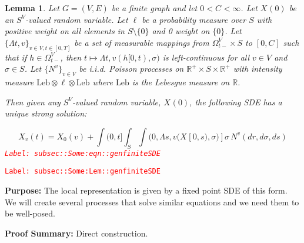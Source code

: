\documentclass[12pt]{article}
\newcommand{\mb}{\mathbb}
\newcommand{\te}{\text}
\newcommand{\tr}{\textcolor{red}}
\newcommand{\labe}[1]{\tr{\texttt{Label: #1}}}
\newcommand{\purpose}{\textbf{Purpose: }}
\newcommand{\pfsum}{\textbf{Proof Summary: }}
\newcommand{\ind}{\hspace{24pt}}
\renewcommand{\v}{v}							%
\renewcommand{\S}{S}							%
\newcommand{\s}{\sigma}							%
\newcommand{\T}{T}								%
\renewcommand{\t}{t}							%
\newcommand{\sset}{\Omega}						%
\renewcommand{\tt}{s}							%
\newcommand{\X}{X}								%
\newcommand{\vind}[1]{^{#1}}					%
\newcommand{\carp}[1]{^{#1}}					%
\newcommand{\vsi}[1]{^{#1}}						%
\newcommand{\cind}[1]{_{#1}}					%
\newcommand{\tp}[1]{(#1)}						%
\newcommand{\tip}[1]{#1}						%
\newcommand{\ts}[1]{_{#1}}						%
\newcommand{\const}{C}							%
\newcommand{\poiss}{N}							%
\newcommand{\leb}{\te{Leb}}						%
\newcommand{\Sm}{\ell}							%
\renewcommand{\r}{r}							%
\newcommand{\indx}[1]{_{#1}}					%
\newcommand{\ratee}{\Lambda}					%
\newtheorem{lem}[thms]{Lemma}
\begin{document}
\begin{lem}
Let \(G = (V,E)\) be a finite graph and let \(0 < \const\indx{}< \infty\). Let \(\X\cind{}\tp{0}\) be an \(\S\carp{V}\)-valued random variable. Let \(\Sm\) be a probability measure over \(\S\) with positive weight on all elements in \(\S\setminus\{0\}\) and 0 weight on \(\{0\}\). Let \(\{\ratee{\t,\v}\}_{\v \in V,\t\in [0,\T]}\) be a set of measurable mappings from \(\sset\vsi{V}\ts{\t-} \times \S\) to \([0,\const\indx{}]\) such that if \(h \in \sset\vsi{V}\ts{\t-}\), then \(\t\mapsto \ratee{\t,\v}(h[0,\t),\s)\) is left-continuous for all \(\v \in V\) and \(\s \in \S\). Let \(\{\poiss\vind{\v}\}_{\v \in V}\) be i.i.d. Poisson processes on \(\mb{R}^+\times \S\times\mb{R}^+\) with intensity measure \(\leb\otimes\Sm\otimes\leb\) where \(\leb\) is the Lebesgue measure on \(\mb{R}\).

\ind Then given any \(\S\carp{V}\)-valued random variable, \(\X\cind{}\tp{0}\), the following SDE has a unique strong solution:

\begin{equation}
\X\cind{\v}\tp{\t} = \X\cind{0}\tp{\v} + \int{(0,\t]}\int_\S\int{(0,\ratee{\tt,\v}(\X\cind{}\tip{[0,\tt)},\s)]}  \s\,\poiss\vind{\v}(d\r,d\s,d\tt)
\label{subsec::Some:eqn::genfiniteSDE}
\end{equation}
\labe{subsec::Some:eqn::genfiniteSDE}
\label{subsec::Some:Lem::genfiniteSDE}
\end{lem}
\labe{subsec::Some:Lem::genfiniteSDE}

\purpose The local representation is given by a fixed point SDE of this form. We will create several processes that solve similar equations and we need them to be well-posed.

\pfsum Direct construction.
\end{document}
